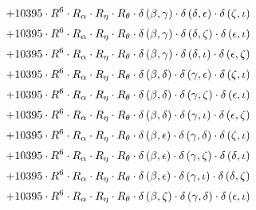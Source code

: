 \begin{subequations}
\begin{gather}
 \\[0.2em] \notag 		 + 10395 \cdot R^{6} \cdot R_{\alpha{}} \cdot R_{\eta{}} \cdot R_{\theta{}} \cdot \delta{}\left(\beta{}, \gamma{}\right) \cdot \delta{}\left(\delta{}, \epsilon{}\right) \cdot \delta{}\left(\zeta{}, \iota{}\right) 
 \\[0.2em] \notag 		 + 10395 \cdot R^{6} \cdot R_{\alpha{}} \cdot R_{\eta{}} \cdot R_{\theta{}} \cdot \delta{}\left(\beta{}, \gamma{}\right) \cdot \delta{}\left(\delta{}, \zeta{}\right) \cdot \delta{}\left(\epsilon{}, \iota{}\right) 
 \\[0.2em] \notag 		 + 10395 \cdot R^{6} \cdot R_{\alpha{}} \cdot R_{\eta{}} \cdot R_{\theta{}} \cdot \delta{}\left(\beta{}, \gamma{}\right) \cdot \delta{}\left(\delta{}, \iota{}\right) \cdot \delta{}\left(\epsilon{}, \zeta{}\right) 
 \\[0.2em] \notag 		 + 10395 \cdot R^{6} \cdot R_{\alpha{}} \cdot R_{\eta{}} \cdot R_{\theta{}} \cdot \delta{}\left(\beta{}, \delta{}\right) \cdot \delta{}\left(\gamma{}, \epsilon{}\right) \cdot \delta{}\left(\zeta{}, \iota{}\right) 
 \\[0.2em] \notag 		 + 10395 \cdot R^{6} \cdot R_{\alpha{}} \cdot R_{\eta{}} \cdot R_{\theta{}} \cdot \delta{}\left(\beta{}, \delta{}\right) \cdot \delta{}\left(\gamma{}, \zeta{}\right) \cdot \delta{}\left(\epsilon{}, \iota{}\right) 
 \\[0.2em] \notag 		 + 10395 \cdot R^{6} \cdot R_{\alpha{}} \cdot R_{\eta{}} \cdot R_{\theta{}} \cdot \delta{}\left(\beta{}, \delta{}\right) \cdot \delta{}\left(\gamma{}, \iota{}\right) \cdot \delta{}\left(\epsilon{}, \zeta{}\right) 
 \\[0.2em] \notag 		 + 10395 \cdot R^{6} \cdot R_{\alpha{}} \cdot R_{\eta{}} \cdot R_{\theta{}} \cdot \delta{}\left(\beta{}, \epsilon{}\right) \cdot \delta{}\left(\gamma{}, \delta{}\right) \cdot \delta{}\left(\zeta{}, \iota{}\right) 
 \\[0.2em] \notag 		 + 10395 \cdot R^{6} \cdot R_{\alpha{}} \cdot R_{\eta{}} \cdot R_{\theta{}} \cdot \delta{}\left(\beta{}, \epsilon{}\right) \cdot \delta{}\left(\gamma{}, \zeta{}\right) \cdot \delta{}\left(\delta{}, \iota{}\right) 
 \\[0.2em] \notag 		 + 10395 \cdot R^{6} \cdot R_{\alpha{}} \cdot R_{\eta{}} \cdot R_{\theta{}} \cdot \delta{}\left(\beta{}, \epsilon{}\right) \cdot \delta{}\left(\gamma{}, \iota{}\right) \cdot \delta{}\left(\delta{}, \zeta{}\right) 
 \\[0.2em] \notag 		 + 10395 \cdot R^{6} \cdot R_{\alpha{}} \cdot R_{\eta{}} \cdot R_{\theta{}} \cdot \delta{}\left(\beta{}, \zeta{}\right) \cdot \delta{}\left(\gamma{}, \delta{}\right) \cdot \delta{}\left(\epsilon{}, \iota{}\right) 

\end{gather}
\end{subequations}
